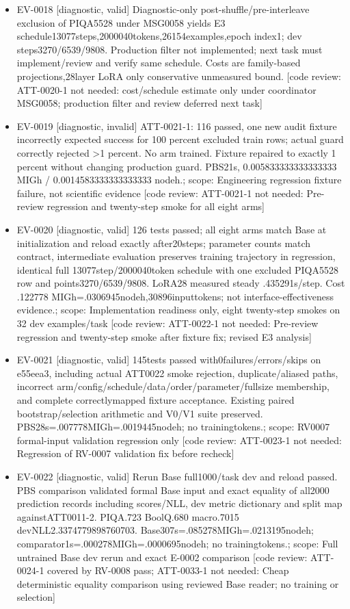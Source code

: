 \documentclass[11pt]{article}
\begin{document}
\begin{itemize}
\item EV-0018 [diagnostic, valid] Diagnostic-only post-shuffle/pre-interleave exclusion of PIQA5528 under MSG0058 yields E3 schedule13077steps,2000040tokens,26154examples,epoch index1; dev steps3270/6539/9808. Production filter not implemented; next task must implement/review and verify same schedule. Costs are family-based projections,28layer LoRA only conservative unmeasured bound. [code review: ATT-0020-1 not needed: cost/schedule estimate only under coordinator MSG0058; production filter and review deferred next task]
\item EV-0019 [diagnostic, invalid] ATT-0021-1: 116 passed, one new audit fixture incorrectly expected success for 100 percent excluded train rows; actual guard correctly rejected \textgreater{}1 percent. No arm trained. Fixture repaired to exactly 1 percent without changing production guard. PBS21s, 0.005833333333333333 MIGh / 0.0014583333333333333 nodeh.; scope: Engineering regression fixture failure, not scientific evidence [code review: ATT-0021-1 not needed: Pre-review regression and twenty-step smoke for all eight arms]
\item EV-0020 [diagnostic, valid] 126 tests passed; all eight arms match Base at initialization and reload exactly after20steps; parameter counts match contract, intermediate evaluation preserves training trajectory in regression, identical full 13077step/2000040token schedule with one excluded PIQA5528 row and points3270/6539/9808. LoRA28 measured steady .435291s/step. Cost .122778 MIGh=.0306945nodeh,30896inputtokens; not interface-effectiveness evidence.; scope: Implementation readiness only, eight twenty-step smokes on 32 dev examples/task [code review: ATT-0022-1 not needed: Pre-review regression and twenty-step smoke after fixture fix; revised E3 analysis]
\item EV-0021 [diagnostic, valid] 145tests passed with0failures/errors/skips on e55eea3, including actual ATT0022 smoke rejection, duplicate/aliased paths, incorrect arm/config/schedule/data/order/parameter/fullsize membership, and complete correctlymapped fixture acceptance. Existing paired bootstrap/selection arithmetic and V0/V1 suite preserved. PBS28s=.007778MIGh=.0019445nodeh; no trainingtokens.; scope: RV0007 formal-input validation regression only [code review: ATT-0023-1 not needed: Regression of RV-0007 validation fix before recheck]
\item EV-0022 [diagnostic, valid] Rerun Base full1000/task dev and reload passed. PBS comparison validated formal Base input and exact equality of all2000 prediction records including scores/NLL, dev metric dictionary and split map againstATT0011-2. PIQA.723 BoolQ.680 macro.7015 devNLL2.3374779898760703. Base307s=.085278MIGh=.0213195nodeh; comparator1s=.000278MIGh=.0000695nodeh; no trainingtokens.; scope: Full untrained Base dev rerun and exact E-0002 comparison [code review: ATT-0024-1 covered by RV-0008 pass; ATT-0033-1 not needed: Cheap deterministic equality comparison using reviewed Base reader; no training or selection]

\end{itemize}
\end{document}
